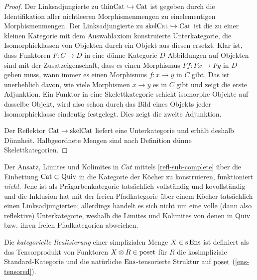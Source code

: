 \begin{proof}
  Der Linksadjungierte zu $\mathrm{thinCat} \hookrightarrow \operatorname{Cat}$ ist gegeben
  durch die Identifikation aller nichtleeren Morphismenmengen zu
  einelementigen Morphismenmengen. Der Linksadjungierte zu
  $\mathrm{skelCat} \hookrightarrow \operatorname{Cat}$ ist die zu einer kleinen Kategorie mit
  dem Auswahlaxiom konstruierte Unterkategorie, die Isomorphieklassen
  von Objekten durch ein Objekt aus diesen ersetzt. Klar ist, dass
  Funktoren $F: C \to D$ in eine dünne Kategorie $D$ Abbildungen auf
  Objekten sind mit der Zusatzeigenschaft, dass es einen Morphismus
  $Ff: Fx \to Fy$ in $D$ geben muss, wann immer es einen Morphismus
  $f: x \to y$ in $C$ gibt. Das ist unerheblich davon, wie viele
  Morphismen $x \to y$ es in $C$ gibt und zeigt die erste
  Adjunktion. Ein Funktor in eine Skelettkategorie schickt isomorphe
  Objekte auf dasselbe Objekt, wird also schon durch das Bild eines
  Objekts jeder Isomorphieklasse eindeutig festgelegt. Dies zeigt die
  zweite Adjunktion.

  Der Reflektor $\operatorname{Cat} \to \mathrm{skelCat}$ liefert eine
  Unterkategorie und erhält deshalb Dünnheit. Halbgeordnete Mengen
  sind nach Definition dünne Skelettkategorien.
\end{proof}
\begin{bem}
  Der Ansatz, Limites und Kolimites in $Cat$ mittels
  \ref{refl-sub-complete} über die Einbettung $\operatorname{Cat} \subset
  \mathrm{Quiv}$ in die Kategorie der Köcher zu konstruieren,
  funktioniert \emph{nicht}. Jene ist als Prägarbenkategorie
  tatsächlich vollständig und kovollständig und die Inklusion hat mit
  der freien Pfadkategorie über einem Köcher tatsächlich einen
  Linksadjungierten; allerdings handelt es sich nicht um eine volle
  (dann also reflektive) Unterkategorie, weshalb die Limites und
  Kolimites von denen in $\mathrm{Quiv}$ bzw. ihren freien
  Pfadkategorien abweichen.
\end{bem}
\begin{defn}
  Die \emph{kategorielle Realisierung} einer simplizialen Menge $X \in
  \operatorname{s}\operatorname{Ens}$ ist definiert als das Tensorprodukt von Funktoren $X \otimes
  R \in \operatorname{poset}$ für $R$ die kosimpliziale Standard-Kategorie und die
  natürliche $\operatorname{Ens}$-tensorierte Struktur auf $\operatorname{poset}$
  (\ref{ens-tensored}).
\end{defn}

